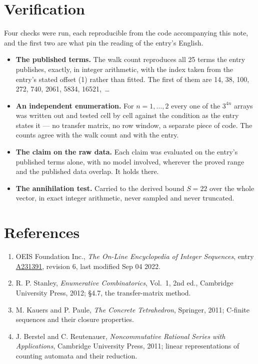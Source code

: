 \documentclass[11pt]{article}
\theoremstyle{definition}
\begin{document}
\section{Verification}

Four checks were run, each reproducible from the code accompanying this note, and the first two are what pin the reading of the entry's English.

\begin{itemize}

\item {\bfseries The published terms.} The walk count reproduces all 25 terms the entry publishes, exactly, in integer arithmetic, with the index taken from the entry's stated offset (1) rather than fitted. The first of them are 14, 38, 100, 272, 740, 2061, 5834, 16521,~\dots

\item {\bfseries An independent enumeration.} For $n = 1,\dots,2$ every one of the $3^{4n}$ arrays was written out and tested cell by cell against the condition as the entry states it --- no transfer matrix, no row window, a separate piece of code. The counts agree with the walk count and with the entry.

\item {\bfseries The claim on the raw data.} Each claim was evaluated on the entry's published terms alone, with no model involved, wherever the proved range and the published data overlap. It holds there.

\item {\bfseries The annihilation test.} Carried to the derived bound $S = 22$ over the whole vector, in exact integer arithmetic, never sampled and never truncated.

\end{itemize}

\section{References}

\begin{enumerate}

\item OEIS Foundation Inc., \emph{The On-Line Encyclopedia of Integer Sequences}, entry \href{https://oeis.org/A231391}{A231391}, revision 6, last modified Sep 04 2022.

\item R. P. Stanley, \emph{Enumerative Combinatorics}, Vol.~1, 2nd ed., Cambridge University Press, 2012; \S4.7, the transfer-matrix method.

\item M. Kauers and P. Paule, \emph{The Concrete Tetrahedron}, Springer, 2011; C-finite sequences and their closure properties.

\item J. Berstel and C. Reutenauer, \emph{Noncommutative Rational Series with Applications}, Cambridge University Press, 2011; linear representations of counting automata and their reduction.

\end{enumerate}
\end{document}

